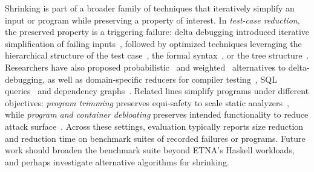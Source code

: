 Shrinking is part of a broader family of techniques that iteratively simplify an input
or program while preserving a property of interest. In \emph{test-case reduction}, the
preserved property is a triggering failure: delta debugging introduced iterative
simplification of failing inputs~\cite{zeller2002simplifying}, followed by optimized
techniques leveraging the hierarchical structure of the test
case~\cite{misherghi2006hdd}, the formal syntax~\cite{sun2018perses}, or the tree
structure~\cite{herfert2017automatically}. Researchers have also proposed
probabilistic~\cite{wang2021probabilistic} and weighted~\cite{zhou2025wdd} alternatives
to delta-debugging, as well as domain-specific reducers for compiler
testing~\cite{RegehrCCEEY12,donaldson2021test}, SQL queries~\cite{lin2024sqless} and
dependency graphs~\cite{kalhauge2019binary}. Related lines simplify programs under
different objectives: \emph{program trimming} preserves equi-safety to scale static
analyzers~\cite{ferles2017failure}, while \emph{program and container debloating}
preserves intended functionality to reduce attack
surface~\cite{rastogi2017cimplifier,heo2018effective}. Across these settings,
evaluation typically reports size reduction and reduction time on benchmark suites of
recorded failures or programs. Future work should broaden the benchmark suite beyond
ETNA's Haskell workloads, and perhaps investigate alternative algorithms for shrinking.
